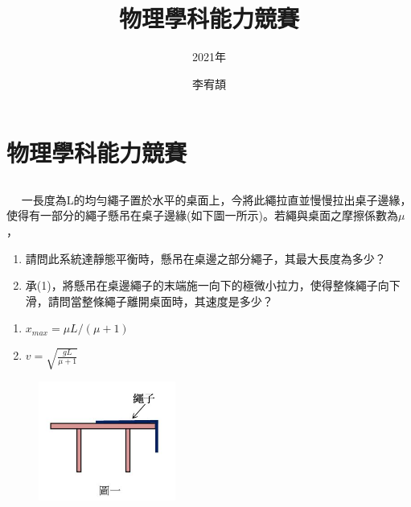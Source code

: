 \documentclass[cn,10pt,math=newtx,chinesefont=founder]{elegantbook}
\title{物理學科能力競賽}
\subtitle{2021年}
\author{李宥頡}
\institute{National Taiwan University}
\begin{document}
\maketitle

\mainmatter

\chapter{物理學科能力競賽}
\section{}

\begin{example}　
    一長度為L的均勻繩子置於水平的桌面上，今將此繩拉直並慢慢拉出桌子邊緣，使得有一部分的繩子懸吊在桌子邊緣(如下圖一所示)。若繩與桌面之摩擦係數為$\mu$，
    \begin{enumerate}[label=(\arabic*)]
    \item 請問此系統達靜態平衡時，懸吊在桌邊之部分繩子，其最大長度為多少？
    \item 承(1)，將懸吊在桌邊繩子的末端施一向下的極微小拉力，使得整條繩子向下滑，請問當整條繩子離開桌面時，其速度是多少？
    \end{enumerate}
    
    \rightline{[1]}
\end{example}

\begin{solution}
\begin{enumerate}[label=(\arabic*)]
\item $x_{max}=\mu L/(\mu+1)$
\item $v=\sqrt{\frac{gL}{\mu+1}}$
\end{enumerate}
\end{solution}

\begin{figure}[htbp]
\flushright
\includegraphics[width=0.4\textwidth]{image/1.JPG}
\end{figure}
\end{document}
